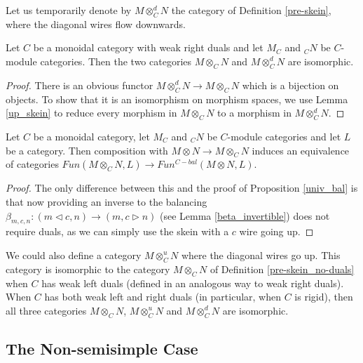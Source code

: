 Let us temporarily denote by $M\otimes_C^d N$ the category of Definition \ref{pre-skein}, where the diagonal wires flow downwards.

\begin{lemma}
  
Let $C$ be a monoidal category with weak right duals and let $M_C$ and $_{C}N$ be $C$-module categories. Then the two categories $M\otimes_C N$ and $M\otimes^{d}_C N$ are isomorphic.\end{lemma}
\begin{proof}

There is an obvious functor $M\otimes_C^d N\to M\otimes_C N$ which is a bijection on objects. To show that it is an isomorphism on morphism spaces, we use Lemma \ref{up_skein} to reduce every morphism in $M\otimes_C N$ to a morphism in $M\otimes^d_C N$.\end{proof}


\begin{proposition}
Let $C$ be a monoidal category, let $M_C$ and $_{C}N$ be $C$-module categories and let $L$ be a category. Then composition with
  $M\otimes N \to M\otimes_C N$ induces an equivalence of categories
  $Fun(M\otimes_C N,L)\to Fun^{C-bal}(M\otimes N,L)$.\end{proposition}
\begin{proof}
  The only difference between this and the proof of Proposition \ref{univ_bal} is that now providing an inverse to the balancing $\beta_{m,c,n}:(m\lhd c, n)\to (m,c\rhd n)$ (see Lemma \ref{beta_invertible}) does not require duals, as we can simply use the skein with a $c$ wire going up.\end{proof}
  
  \begin{remark}
   We could also define a category $M\otimes_C^u N$ where the diagonal wires go up. This category is isomorphic to the category $M\otimes_C N$ of Definition \ref{pre-skein_no-duals} when $C$ has weak left duals (defined in an analogous way to weak right duals). When $C$ has both weak left and right duals (in particular, when $C$ is rigid), then all three categories $M\otimes_C N$, $M\otimes^u_C N$ and $M\otimes_C^d N$ are isomorphic.\end{remark}

\subsection{The Non-semisimple Case} \label{section-nonsemisimple}

